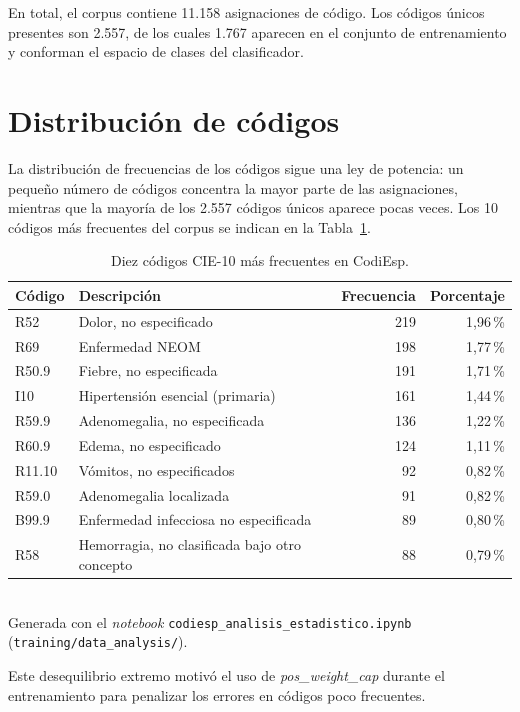 En total, el corpus contiene 11.158 asignaciones de código. Los códigos únicos presentes son 2.557, de los cuales 1.767 aparecen en el conjunto de entrenamiento y conforman el espacio de clases del clasificador.

\section{Distribución de códigos}

La distribución de frecuencias de los códigos sigue una ley de potencia: un pequeño número de códigos concentra la mayor parte de las asignaciones, mientras que la mayoría de los 2.557 códigos únicos aparece pocas veces. Los 10 códigos más frecuentes del corpus se indican en la Tabla~\ref{tab:top-codes}.

\begin{table}[h]
\centering
\caption{Diez códigos CIE-10 más frecuentes en CodiEsp.}
\label{tab:top-codes}
\begin{tabular}{llrr}
\hline
\textbf{Código} & \textbf{Descripción} & \textbf{Frecuencia} & \textbf{Porcentaje} \\
\hline
R52 & Dolor, no especificado & 219 & 1{,}96\,\% \\
R69 & Enfermedad NEOM & 198 & 1{,}77\,\% \\
R50.9 & Fiebre, no especificada & 191 & 1{,}71\,\% \\
I10 & Hipertensión esencial (primaria) & 161 & 1{,}44\,\% \\
R59.9 & Adenomegalia, no especificada & 136 & 1{,}22\,\% \\
R60.9 & Edema, no especificado & 124 & 1{,}11\,\% \\
R11.10 & Vómitos, no especificados & 92 & 0{,}82\,\% \\
R59.0 & Adenomegalia localizada & 91 & 0{,}82\,\% \\
B99.9 & Enfermedad infecciosa no especificada & 89 & 0{,}80\,\% \\
R58 & Hemorragia, no clasificada bajo otro concepto & 88 & 0{,}79\,\% \\
\hline
\end{tabular}
\\[4pt]
{\footnotesize Generada con el \emph{notebook} \texttt{codiesp\_\allowbreak{}analisis\_\allowbreak{}estadistico.ipynb} (\texttt{training/\allowbreak{}data\_analysis/}).}
\end{table}

Este desequilibrio extremo motivó el uso de \emph{pos\_weight\_cap} durante el entrenamiento para penalizar los errores en códigos poco frecuentes.

